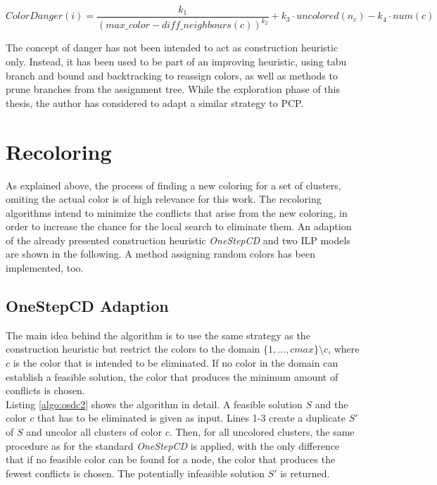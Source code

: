 $$ \mathit{ColorDanger}(i) = \frac{k_1}{(\mathit{max\_color} - \mathit{diff\_neighbours}(c))^{k_2}} + k_3 \cdot \mathit{uncolored}(n_c) - k_4 \cdot num(c) $$

The concept of danger has not been intended to act as construction heuristic only. Instead, it has been used to be part of an improving heuristic, using tabu branch and bound and backtracking to reassign colors, as well as methods to prune branches from the assignment tree. While the exploration phase of this thesis, the author has considered to adapt a similar strategy to PCP.

\section{Recoloring}
\label{sec:recoloring}

As explained above, the process of finding a new coloring for a set of clusters, omiting the actual color is of high relevance for this work. The recoloring algorithms intend to minimize the conflicts that arise from the new coloring, in order to increase the chance for the local search to eliminate them. An adaption of the already presented construction heuristic \textit{OneStepCD} and two ILP models are shown in the following. A method assigning random colors has been implemented, too.

\subsection{OneStepCD Adaption}

The main idea behind the algorithm is to use the same strategy as the construction heuristic but restrict the colors to the domain $\{1,\ldots,cmax\}\setminus c$, where $c$ is the color that is intended to be eliminated. If no color in the domain can establish a feasible solution, the color that produces the minimum amount of conflicts is chosen.\\
Listing \ref{algo:osdc2} shows the algorithm in detail. A feasible solution $S$ and the color $c$ that has to be eliminated is given as input. Lines 1-3 create a duplicate $S'$ of $S$ and uncolor all clusters of color $c$. Then, for all uncolored clusters, the same procedure as for the standard \textit{OneStepCD} is applied, with the only difference that if no feasible color can be found for a node, the color that produces the fewest conflicts is chosen. The potentially infeasible solution $S'$ is returned.

